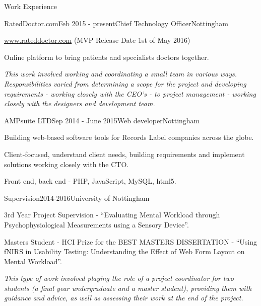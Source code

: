 \documentclass{resume} %
\begin{document}
\begin{rSection}{Work Experience}
    \begin{rSubsection}{RatedDoctor.com}{Feb 2015 - present}{Chief Technology Officer}{Nottingham}
        \item \url{www.rateddoctor.com} (MVP Release Date 1st of May 2016)
        \item Online platform to bring patients and specialists doctors together.
        \item \emph{This work involved working and coordinating a small team in various ways. Responsibilities varied from determining a scope for the project and developing requirements - working closely with the CEO's - to project management - working closely with the designers and development team.}
    \end{rSubsection}


    \begin{rSubsection}{AMPsuite LTD}{Sep 2014 - June 2015}{Web developer}{Nottingham}
        \item Building web-based software tools for Records Label companies across the globe.
        \item Client-focused, understand client needs, building requirements and implement solutions working closely with the CTO. 
        \item Front end, back end - PHP, JavaScript, MySQL, html5.
    \end{rSubsection}
    
    \begin{rSubsection}{Supervision}{2014-2016}{}{University of Nottingham}
        \item  3rd Year Project Supervision - ``Evaluating Mental Workload through Psychophysiological Measurements using a Sensory Device''.
        \item  Masters Student - HCI Prize for the BEST MASTERS DISSERTATION - ``Using fNIRS in Usability Testing: Understanding the Effect of Web Form Layout on Mental Workload''.
        \item \emph{This type of work involved playing the role of a project coordinator for two students (a final year undergraduate and a master student), providing them with guidance and advice, as well as assessing their work at the end of the project. }
    \end{rSubsection}


\end{rSection}
\end{document}
